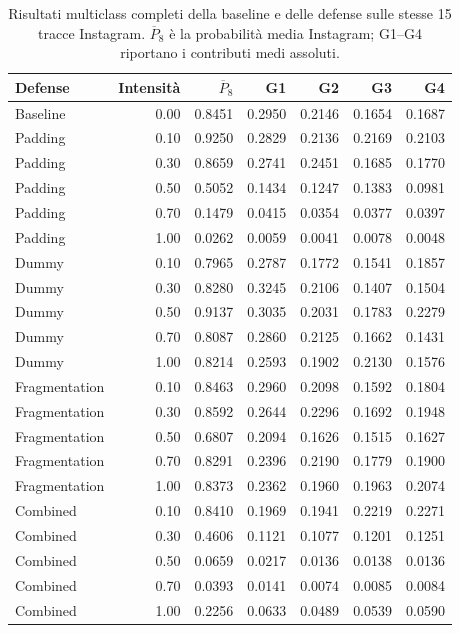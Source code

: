 \documentclass[11pt,a4paper]{article}
\begin{document}
\begin{table}[htbp]
\centering\small
\caption{Risultati multiclass completi della baseline e delle defense sulle stesse 15 tracce Instagram. $\overline{P}_8$ è la probabilità media Instagram; G1--G4 riportano i contributi medi assoluti.}
\label{tab:defense-xai}
\begin{tabular}{lrrrrrr}
\toprule
Defense & Intensità & $\overline{P}_8$ & G1 & G2 & G3 & G4 \\
\midrule
Baseline & 0.00 & 0.8451 & 0.2950 & 0.2146 & 0.1654 & 0.1687 \\
Padding & 0.10 & 0.9250 & 0.2829 & 0.2136 & 0.2169 & 0.2103 \\
Padding & 0.30 & 0.8659 & 0.2741 & 0.2451 & 0.1685 & 0.1770 \\
Padding & 0.50 & 0.5052 & 0.1434 & 0.1247 & 0.1383 & 0.0981 \\
Padding & 0.70 & 0.1479 & 0.0415 & 0.0354 & 0.0377 & 0.0397 \\
Padding & 1.00 & 0.0262 & 0.0059 & 0.0041 & 0.0078 & 0.0048 \\
Dummy & 0.10 & 0.7965 & 0.2787 & 0.1772 & 0.1541 & 0.1857 \\
Dummy & 0.30 & 0.8280 & 0.3245 & 0.2106 & 0.1407 & 0.1504 \\
Dummy & 0.50 & 0.9137 & 0.3035 & 0.2031 & 0.1783 & 0.2279 \\
Dummy & 0.70 & 0.8087 & 0.2860 & 0.2125 & 0.1662 & 0.1431 \\
Dummy & 1.00 & 0.8214 & 0.2593 & 0.1902 & 0.2130 & 0.1576 \\
Fragmentation & 0.10 & 0.8463 & 0.2960 & 0.2098 & 0.1592 & 0.1804 \\
Fragmentation & 0.30 & 0.8592 & 0.2644 & 0.2296 & 0.1692 & 0.1948 \\
Fragmentation & 0.50 & 0.6807 & 0.2094 & 0.1626 & 0.1515 & 0.1627 \\
Fragmentation & 0.70 & 0.8291 & 0.2396 & 0.2190 & 0.1779 & 0.1900 \\
Fragmentation & 1.00 & 0.8373 & 0.2362 & 0.1960 & 0.1963 & 0.2074 \\
Combined & 0.10 & 0.8410 & 0.1969 & 0.1941 & 0.2219 & 0.2271 \\
Combined & 0.30 & 0.4606 & 0.1121 & 0.1077 & 0.1201 & 0.1251 \\
Combined & 0.50 & 0.0659 & 0.0217 & 0.0136 & 0.0138 & 0.0136 \\
Combined & 0.70 & 0.0393 & 0.0141 & 0.0074 & 0.0085 & 0.0084 \\
Combined & 1.00 & 0.2256 & 0.0633 & 0.0489 & 0.0539 & 0.0590 \\
\bottomrule
\end{tabular}
\end{table}
\end{document}

